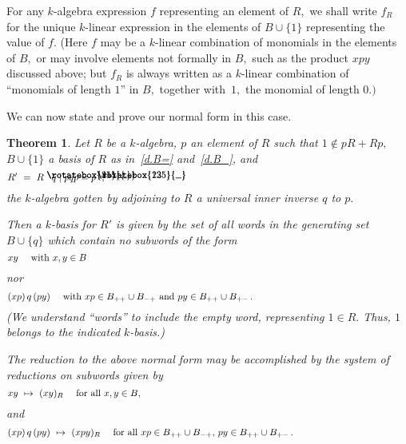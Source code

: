\documentclass{amsart}
\newtheorem{theorem}{Theorem}
\DeclareRobustCommand{\lang}{\begin{picture}(5,7)
\put(1.2,2.5){\rotatebox{45}{\line(1,0){6.0}}}
\put(1.2,2.5){\rotatebox{315}{\line(1,0){6.0}}}
\end{picture}\kern.16em}
\DeclareRobustCommand{\rang}{\kern.1em\begin{picture}(5,7)
\put(.1,2.5){\rotatebox{135}{\line(1,0){6.0}}}
\put(.1,2.5){\rotatebox{225}{\line(1,0){6.0}}}
\end{picture}}
\begin{document}
For any $\!k\!$-algebra expression $f$ representing an element
of $R,$ we shall write $f_R$ for the unique $\!k\!$-linear expression
in the elements of $B\cup\{1\}$ representing the value of $f.$
(Here $f$ may be a $\!k\!$-linear combination of monomials
in the elements of $B,$
or may involve elements not formally in $B,$ such as the
product $xpy$ discussed above;
but $f_R$ is always written as a $\!k\!$-linear combination of
``monomials of length $1$'' in $B,$ together with~$1,$ the monomial
of length $0.)$

We can now state and prove our normal form in this case.

\begin{theorem}\label{T.1_notin}
Let $R$ be a $\!k\!$-algebra, $p$ an element of $R$
such that $1\notin pR+Rp,$ $B\cup\{1\}$
a basis of $R$ as in~\eqref{d.B=} and~\eqref{d.B_}, and
\begin{equation}\begin{minipage}[c]{35pc}\label{d.R'}
$R'\ =\ R\,\lang q\mid pqp=p\rang,$
\end{minipage}\end{equation}
the $\!k\!$-algebra gotten by adjoining to $R$ a universal
inner inverse $q$ to $p.$

Then a $\!k\!$-basis for $R'$ is given by the set of all
words in the generating set $B\cup\{q\}$ which contain no
subwords of the form
\begin{equation}\begin{minipage}[c]{35pc}\label{d.xy}
$xy$ \quad with $x,y\in B$
\end{minipage}\end{equation}
nor
\begin{equation}\begin{minipage}[c]{35pc}\label{d.xpqpy}
$(xp)\,q\,(py)$ \quad with $xp\in B_{++}\cup B_{-+}$
and $py\in B_{++}\cup B_{+-}\,.$
\end{minipage}\end{equation}
\textup{(}We understand ``words'' to include the
empty word, representing $1\in R.$
Thus, $1$ belongs to the indicated $\!k\!$-basis.\textup{)}

The reduction to the above normal
form may be accomplished by the system of reductions on subwords
given by
\begin{equation}\begin{minipage}[c]{35pc}\label{d.xy|->}
$xy\ \mapsto\ (xy)_R$ \quad for all $x,y\in B,$
\end{minipage}\end{equation}
and
\begin{equation}\begin{minipage}[c]{35pc}\label{d.xpqpy|->}
$(xp)\,q\,(py)\ \mapsto\ (xpy)_R$ \quad for all
$xp\in B_{++}\cup B_{-+},$ $py\in B_{++}\cup B_{+-}\,.$
\end{minipage}\end{equation}
\end{theorem}
\end{document}
